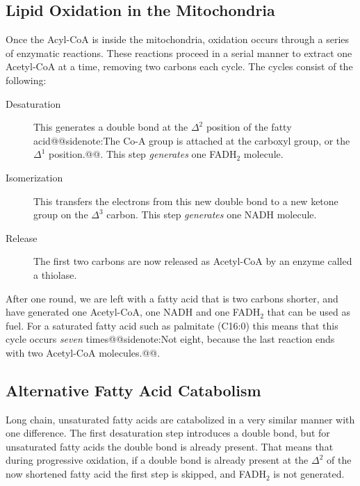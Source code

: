 \documentclass{tufte-handout}
\makeatletter
\def\sidenote#1{@@sidenote:#1@@}
\makeatother
\begin{document}
\subsection{Lipid Oxidation in the Mitochondria}

Once the Acyl-CoA is inside the mitochondria, oxidation occurs through a series of enzymatic reactions.  These reactions proceed in a serial manner to extract one Acetyl-CoA at a time, removing two carbons each cycle.  The cycles consist of the following:

\begin{description}
\item [Desaturation] This generates a double bond at the $\Delta^2$ position of the fatty acid\sidenote{The Co-A group is attached at the carboxyl group, or the $\Delta^1$ position.}.  This step \emph{generates} one FADH$_2$ molecule.
\item [Isomerization] This transfers the electrons from this new double bond to a new ketone group on the  $\Delta^3$ carbon.  This step \emph{generates} one NADH molecule.
\item [Release] The first two carbons are now released as Acetyl-CoA by an enzyme called a thiolase.
\end{description} 

After one round, we are left with a fatty acid that is two carbons shorter, and have generated one Acetyl-CoA, one NADH and one FADH$_2$ that can be used as fuel.  For a saturated fatty acid such as palmitate (C16:0) this means that this cycle occurs \emph{seven} times\sidenote{Not eight, because the last reaction ends with two Acetyl-CoA molecules.}.

\subsection{Alternative Fatty Acid Catabolism}

Long chain, unsaturated fatty acids are catabolized in a very similar manner with one difference.  The first desaturation step introduces a double bond, but for unsaturated fatty acids the double bond is already present.  That means that during progressive oxidation, if a double bond is already present at the $\Delta^2$ of the now shortened fatty acid the first step is skipped, and FADH$_2$ is not generated.
\end{document}
